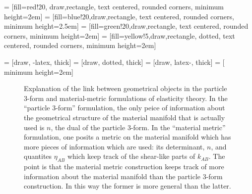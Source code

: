 
 = [fill=red!20, draw,rectangle,  text centered, rounded corners, minimum height=2em]
 = [fill=blue!20,draw,rectangle,  text centered, rounded corners, minimum height=2.5em]
 = [fill=green!20,draw,rectangle,  text centered, rounded corners, minimum height=2em]
 = [fill=yellow!5,draw,rectangle,   dotted, text centered, rounded corners, minimum height=2em]

 = [draw,  -latex,   thick]
 = [draw,  dotted, thick]
 = [draw,  latex-,   thick]
 = [ minimum height=2em]

\begin{figure}[!t]
\begin{centering}
\caption{Explanation of the link between geometrical objects in  the particle 3-form and material-metric formulations of elasticity theory. In the ``particle 3-form'' formulation, the only peice of information about the geometrical structure of the material manifold that is actually used is $n$, the dual of the particle 3-form. In the ``material metric'' formulation, one posits a metric on the material manifold which has more pieces of information which are used: its determinant, $n$, and quantites $\eta_{AB}$ which keep track of the shear-like parts of $k_{AB}$. The point is that the material metric construction keeps track of more information about the material manifold than the particle 3-form construction. In this way the former is more general than the latter.}\label{fig:obj_links}
\end{centering}
\end{figure}
 